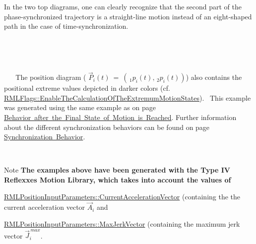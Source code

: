 In the two top diagrams, one can clearly recognize that the second part of the phase-\/synchronized trajectory is a straight-\/line motion instead of an eight-\/shaped path in the case of time-\/synchronization.

~\newline
~\newline
 

~\newline
 

~\newline
~\newline
 The position diagram ( $ \vec{P}_i(t)\ =\ \left(\,\!_1p_i(t),\,_2p_i(t)\right) $) also contains the positional extreme values depicted in darker colors (cf. \mbox{\hyperlink{classRMLFlags_a5f2076c59d030993ee522b99873a41cb}{R\+M\+L\+Flags\+::\+Enable\+The\+Calculation\+Of\+The\+Extremum\+Motion\+States}}).~\newline
 This example was generated using the same example as on page \mbox{\hyperlink{page_FinalStateReachedBehavior}{Behavior after the Final State of Motion is Reached}}. Further information about the different synchronization behaviors can be found on page \mbox{\hyperlink{page_SynchronizationBehavior}{Synchronization Behavior}}.

~\newline
~\newline
 \begin{DoxyNote}{Note}
{\bfseries{The examples above have been generated with the Type IV Reflexxes Motion Library, which takes into account the values of}}~\newline
~\newline

\begin{DoxyItemize}
\item \mbox{\hyperlink{classRMLInputParameters_a423bf4b1ef337cbf6eee22fe2e2502c1}{R\+M\+L\+Position\+Input\+Parameters\+::\+Current\+Acceleration\+Vector}} (containing the the current acceleration vector $ \vec{A}_i$ and 
\item \mbox{\hyperlink{classRMLInputParameters_a5968ce643868260410f149996c446b66}{R\+M\+L\+Position\+Input\+Parameters\+::\+Max\+Jerk\+Vector}} (containing the maximum jerk vector $ \vec{J}_i^{\,max} $. ~\newline
~\newline
 
\end{DoxyItemize}
\end{DoxyNote}
~\newline
